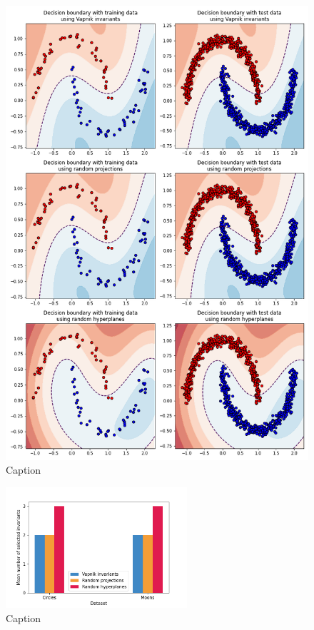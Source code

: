 \begin{figure}
    \centering
    \includegraphics[width=\textwidth]{thesis/Figures/moons_decision_boundaries.png}
    \caption{Caption}
    \label{fig:moons_decision_boundary}
\end{figure}

\begin{figure}
    \centering
    \includegraphics[width=0.6\textwidth]{thesis/Figures/num_selected_invariants.png}
    \caption{Caption}
    \label{fig:toys_small_num_selected_invariants}
\end{figure}

